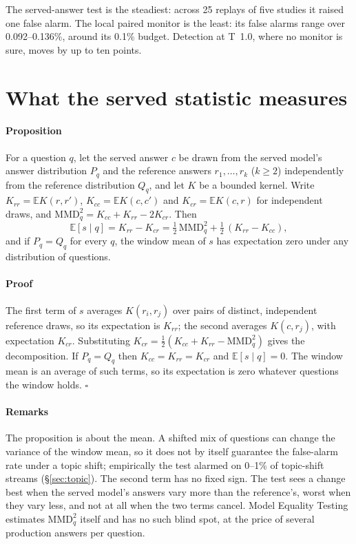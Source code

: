 \documentclass[11pt]{article}
\begin{document}
\noindent The served-answer test is the steadiest: across 25 replays of five studies
it raised one false alarm. The local paired monitor is the least: its false alarms
range over 0.092--0.136\%, around its 0.1\% budget. Detection at T~1.0, where
no monitor is sure, moves by up to ten points.

\section{What the served statistic measures}
\label{app:theory}

\paragraph{Proposition} For a question $q$, let the served answer $c$ be drawn from
the served model's answer distribution $P_q$ and the reference answers
$r_1,\dots,r_k$ ($k\ge2$) independently from the reference distribution $Q_q$, and let
$K$ be a bounded kernel. Write $K_{rr}=\mathbb{E}K(r,r')$, $K_{cc}=\mathbb{E}K(c,c')$
and $K_{cr}=\mathbb{E}K(c,r)$ for independent draws, and
$\mathrm{MMD}^2_q=K_{cc}+K_{rr}-2K_{cr}$. Then
\[
  \mathbb{E}[s\mid q]=K_{rr}-K_{cr}=\tfrac12\,\mathrm{MMD}^2_q+\tfrac12\,(K_{rr}-K_{cc}),
\]
and if $P_q=Q_q$ for every $q$, the window mean of $s$ has expectation zero under any
distribution of questions.

\paragraph{Proof} The first term of $s$ averages $K(r_i,r_j)$ over pairs of distinct,
independent reference draws, so its expectation is $K_{rr}$; the second averages
$K(c,r_j)$, with expectation $K_{cr}$. Substituting
$K_{cr}=\tfrac12(K_{cc}+K_{rr}-\mathrm{MMD}^2_q)$ gives the decomposition. If
$P_q=Q_q$ then $K_{cc}=K_{rr}=K_{cr}$ and $\mathbb{E}[s\mid q]=0$. The window mean is an
average of such terms, so its expectation is zero whatever questions the window
holds. \hfill$\square$

\paragraph{Remarks} The proposition is about the mean. A shifted mix of questions can
change the variance of the window mean, so it does not by itself guarantee the
false-alarm rate under a topic shift; empirically the test alarmed on 0--1\% of
topic-shift streams (\S\ref{sec:topic}). The second term has no fixed sign. The test
sees a change best when the served model's answers vary more than the reference's,
worst when they vary less, and not at all when the two terms cancel. Model Equality
Testing estimates $\mathrm{MMD}^2_q$ itself and has no such blind spot, at the price
of several production answers per question.
\end{document}
